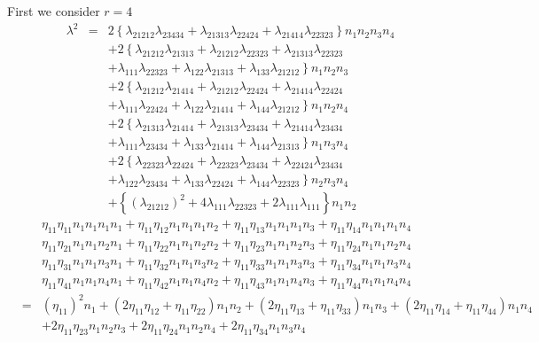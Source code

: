 \documentclass[12pt]{article}
\begin{document}
First we consider $r=4$%
\begin{eqnarray}
\lambda ^{2} &=&2\left\{ \lambda _{21212}\lambda _{23434}+\lambda
_{21313}\lambda _{22424}+\lambda _{21414}\lambda _{22323}\right\}
n_{1}n_{2}n_{3}n_{4} \\
&&+2\left\{ \lambda _{21212}\lambda _{21313}+\lambda _{21212}\lambda
_{22323}+\lambda _{21313}\lambda _{22323}\right. \\
&&+\left. \lambda _{111}\lambda _{22323}+\lambda _{122}\lambda
_{21313}+\lambda _{133}\lambda _{21212}\right\} n_{1}n_{2}n_{3} \\
&&+2\left\{ \lambda _{21212}\lambda _{21414}+\lambda _{21212}\lambda
_{22424}+\lambda _{21414}\lambda _{22424}\right. \\
&&+\left. \lambda _{111}\lambda _{22424}+\lambda _{122}\lambda
_{21414}+\lambda _{144}\lambda _{21212}\right\} n_{1}n_{2}n_{4} \\
&&+2\left\{ \lambda _{21313}\lambda _{21414}+\lambda _{21313}\lambda
_{23434}+\lambda _{21414}\lambda _{23434}\right. \\
&&+\left. \lambda _{111}\lambda _{23434}+\lambda _{133}\lambda
_{21414}+\lambda _{144}\lambda _{21313}\right\} n_{1}n_{3}n_{4} \\
&&+2\left\{ \lambda _{22323}\lambda _{22424}+\lambda _{22323}\lambda
_{23434}+\lambda _{22424}\lambda _{23434}\right. \\
&&+\left. \lambda _{122}\lambda _{23434}+\lambda _{133}\lambda
_{22424}+\lambda _{144}\lambda _{22323}\right\} n_{2}n_{3}n_{4} \\
&&+\left\{ \left( \lambda _{21212}\right) ^{2}+4\lambda _{111}\lambda
_{22323}+2\lambda _{111}\lambda _{111}\right\} n_{1}n_{2}
\end{eqnarray}
\begin{eqnarray}
&&\eta _{11}\eta _{11}n_{1}n_{1}n_{1}n_{1}+\eta _{11}\eta
_{12}n_{1}n_{1}n_{1}n_{2}+\eta _{11}\eta _{13}n_{1}n_{1}n_{1}n_{3}+\eta
_{11}\eta _{14}n_{1}n_{1}n_{1}n_{4} \\
&&\eta _{11}\eta _{21}n_{1}n_{1}n_{2}n_{1}+\eta _{11}\eta
_{22}n_{1}n_{1}n_{2}n_{2}+\eta _{11}\eta _{23}n_{1}n_{1}n_{2}n_{3}+\eta
_{11}\eta _{24}n_{1}n_{1}n_{2}n_{4} \\
&&\eta _{11}\eta _{31}n_{1}n_{1}n_{3}n_{1}+\eta _{11}\eta
_{32}n_{1}n_{1}n_{3}n_{2}+\eta _{11}\eta _{33}n_{1}n_{1}n_{3}n_{3}+\eta
_{11}\eta _{34}n_{1}n_{1}n_{3}n_{4} \\
&&\eta _{11}\eta _{41}n_{1}n_{1}n_{4}n_{1}+\eta _{11}\eta
_{42}n_{1}n_{1}n_{4}n_{2}+\eta _{11}\eta _{43}n_{1}n_{1}n_{4}n_{3}+\eta
_{11}\eta _{44}n_{1}n_{1}n_{4}n_{4} \\
&=&\left( \eta _{11}\right) ^{2}n_{1}+\left( 2\eta _{11}\eta _{12}+\eta
_{11}\eta _{22}\right) n_{1}n_{2}+\left( 2\eta _{11}\eta _{13}+\eta
_{11}\eta _{33}\right) n_{1}n_{3}+\left( 2\eta _{11}\eta _{14}+\eta
_{11}\eta _{44}\right) n_{1}n_{4} \\
&&+2\eta _{11}\eta _{23}n_{1}n_{2}n_{3}+2\eta _{11}\eta
_{24}n_{1}n_{2}n_{4}+2\eta _{11}\eta _{34}n_{1}n_{3}n_{4}
\end{eqnarray}%
\end{document}
